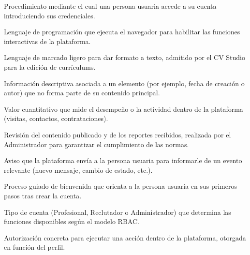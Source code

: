 \begin{description}[style=unboxed,leftmargin=0pt,itemsep=4pt]
    \item[\textcolor{colorPrimario}{\textbf{Inicio de sesión (login)}}] Procedimiento
    mediante el cual una persona usuaria accede a su cuenta introduciendo sus
    credenciales.

    \item[\textcolor{colorPrimario}{\textbf{JavaScript}}] Lenguaje de programación que
    ejecuta el navegador para habilitar las funciones interactivas de la plataforma.

    \item[\textcolor{colorPrimario}{\textbf{Markdown}}] Lenguaje de marcado ligero para
    dar formato a texto, admitido por el CV Studio para la edición de currículums.

    \item[\textcolor{colorPrimario}{\textbf{Metadatos}}] Información descriptiva asociada
    a un elemento (por ejemplo, fecha de creación o autor) que no forma parte de su
    contenido principal.

    \item[\textcolor{colorPrimario}{\textbf{Métrica}}] Valor cuantitativo que mide el
    desempeño o la actividad dentro de la plataforma (visitas, contactos, contrataciones).

    \item[\textcolor{colorPrimario}{\textbf{Moderación}}] Revisión del contenido
    publicado y de los reportes recibidos, realizada por el Administrador para garantizar
    el cumplimiento de las normas.

    \item[\textcolor{colorPrimario}{\textbf{Notificación}}] Aviso que la plataforma envía
    a la persona usuaria para informarle de un evento relevante (nuevo mensaje, cambio de
    estado, etc.).

    \item[\textcolor{colorPrimario}{\textbf{Onboarding}}] Proceso guiado de bienvenida
    que orienta a la persona usuaria en sus primeros pasos tras crear la cuenta.

    \item[\textcolor{colorPrimario}{\textbf{Perfil}}] Tipo de cuenta (Profesional,
    Reclutador o Administrador) que determina las funciones disponibles según el modelo
    RBAC.

    \item[\textcolor{colorPrimario}{\textbf{Permiso}}] Autorización concreta para
    ejecutar una acción dentro de la plataforma, otorgada en función del perfil.


\end{description}
